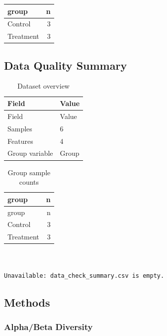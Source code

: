 \documentclass[
  letterpaper,
  DIV=11,
  numbers=noendperiod]{scrartcl}
\newcounter{none} %
\begin{document}
{\def\LTcaptype{none} %
\begin{longtable}[]{@{}lr@{}}
\toprule\noalign{}
group & n \\
\midrule\noalign{}
\endhead
\bottomrule\noalign{}
\endlastfoot
Control & 3 \\
Treatment & 3 \\
\end{longtable}
}

\subsection{Data Quality Summary}\label{data-quality-summary}

\begin{longtable}[]{@{}ll@{}}
\caption{Dataset overview}\tabularnewline
\toprule\noalign{}
Field & Value \\
\midrule\noalign{}
\endfirsthead
\toprule\noalign{}
Field & Value \\
\midrule\noalign{}
\endhead
\bottomrule\noalign{}
\endlastfoot
Samples & 6 \\
Features & 4 \\
Group variable & Group \\
\end{longtable}

\begin{longtable}[]{@{}lr@{}}
\caption{Group sample counts}\tabularnewline
\toprule\noalign{}
group & n \\
\midrule\noalign{}
\endfirsthead
\toprule\noalign{}
group & n \\
\midrule\noalign{}
\endhead
\bottomrule\noalign{}
\endlastfoot
Control & 3 \\
Treatment & 3 \\
\end{longtable}

\begin{verbatim}


Unavailable: data_check_summary.csv is empty.
\end{verbatim}

\subsection{Methods}\label{methods}

\subsubsection{Alpha/Beta Diversity}\label{alphabeta-diversity}
\end{document}
